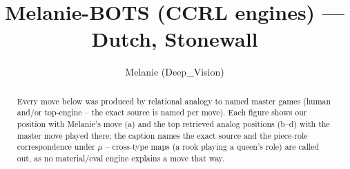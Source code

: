 \documentclass[11pt]{article}
\title{Melanie-BOTS (CCRL engines) — Dutch, Stonewall}
\author{Melanie (Deep\_Vision)}
\date{}
\begin{document}
\maketitle

\begin{abstract}Every move below was produced by relational analogy to named master games (human and/or top-engine -- the exact source is named per move). Each figure shows our position with Melanie's move (a) and the top retrieved analog positions (b--d) with the master move played there; the caption names the exact source and the piece-role correspondence under $\mu$ -- cross-type maps (a rook playing a queen's role) are called out, as no material/eval engine explains a move that way.\end{abstract}

\begin{figure}[p]\centering
\begin{subfigure}{0.46\textwidth}\centering
\resizebox{\linewidth}{!}{%
\newchessgame
\chessboard[
  setfen={rnbqk2r/pp4pp/2pbpn2/3p1p2/2PP4/1P3NP1/P3PPBP/RNBQ1RK1 b kq - 0 7},
  showmover=false,
  pgfstyle=straightmove, color=movearrow, markmove={e8-g8}
]}
\caption{}
\end{subfigure}\hfill
\begin{subfigure}{0.46\textwidth}\centering
\resizebox{\linewidth}{!}{%
\newchessgame
\chessboard[
  setfen={1rbqk2r/ppp3pp/2nbpn2/3p1p2/2PP4/1P3NP1/P3PPBP/RNBQ1RK1 b k - 0 8},
  showmover=false,
  pgfstyle=straightmove, color=movearrow, markmove={e8-g8}
]}
\caption{}
\end{subfigure}
\\[4pt]
\begin{subfigure}{0.46\textwidth}\centering
\resizebox{\linewidth}{!}{%
\newchessgame
\chessboard[
  setfen={1rbqk2r/ppp3pp/2nbpn2/3p1p2/2PP4/1P3NP1/P3PPBP/RNBQ1RK1 b k - 0 8},
  showmover=false,
  pgfstyle=straightmove, color=movearrow, markmove={e8-g8}
]}
\caption{}
\end{subfigure}\hfill
\begin{subfigure}{0.46\textwidth}\centering
\resizebox{\linewidth}{!}{%
\newchessgame
\chessboard[
  setfen={1rbqk2r/ppp3pp/2nbpn2/3p1p2/2PP4/1P3NP1/P3PPBP/RNBQ1RK1 b k - 0 8},
  showmover=false,
  pgfstyle=straightmove, color=movearrow, markmove={e8-g8}
]}
\caption{}
\end{subfigure}

\end{figure}
\end{document}
